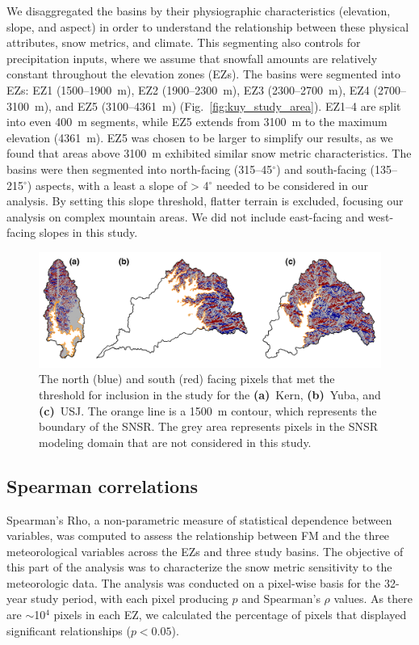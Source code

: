 We disaggregated the basins by their physiographic characteristics (elevation, slope, and aspect) in order to understand the relationship between these physical attributes, snow metrics, and climate. This segmenting also controls for precipitation inputs, where we assume that snowfall amounts are relatively constant throughout the elevation zones (EZs). The basins were segmented into EZs: EZ1 (1500--1900~m), EZ2 (1900--2300~m), EZ3 (2300--2700~m), EZ4 (2700--3100~m), and EZ5 (3100--4361~m) (Fig.~\ref{fig:kuy_study_area}). EZ1--4 are split into even 400~m segments, while EZ5 extends from 3100~m to the maximum elevation (4361~m). EZ5 was chosen to be larger to simplify our results, as we found that areas above 3100~m exhibited similar snow metric characteristics. The basins were then segmented into north-facing (315--45$^{\circ}$) and south-facing (135--215$^{\circ}$) aspects, with a least a slope of > 4$^{\circ}$ needed to be considered in our analysis. By setting this slope threshold, flatter terrain is excluded, focusing our analysis on complex mountain areas. We did not include east-facing and west-facing slopes in this study. 

\begin{figure}[t]
\centering
\includegraphics[width=\textwidth]{figures/ch2_figs/kuy_snow_metric_area_v2.png}
\caption{The north (blue) and south (red) facing pixels that met the threshold for inclusion in the study for the \textbf{(a)}~Kern, \textbf{(b)}~Yuba, and \textbf{(c)}~USJ. The orange line is a 1500~m contour, which represents the boundary of the SNSR. The grey area represents pixels in the SNSR modeling domain that are not considered in this study.}
\label{fig:kuy_snow_metric_area}
\end{figure}


\hypertarget{ch2-methods-3}{\subsection{Spearman correlations}\label{ch2-methods-3}}

Spearman's Rho, a non-parametric measure of statistical dependence between variables, was computed to assess the relationship between FM and the three meteorological variables across the EZs and three study basins. The objective of this part of the analysis was to characterize the snow metric sensitivity to the meteorologic data. The analysis was conducted on a pixel-wise basis for the 32-year study period, with each pixel producing $p$ and Spearman's $\rho$ values. As there are $\sim$10$^4$ pixels in each EZ, we calculated the percentage of pixels that displayed significant relationships ($p < 0.05$).

